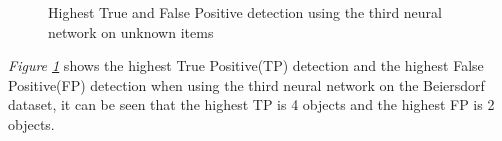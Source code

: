 \begin{figure}[h]
    \centering
    \hfill
    
    \caption{Highest True and False Positive detection using the third neural network on unknown items}
    \label{fig:v3max}
\end{figure}

\textit{Figure \ref{fig:v3max}} shows the highest True Positive(TP) detection and the highest False Positive(FP) detection when using the third neural network on the Beiersdorf dataset, it can be seen that the highest TP is 4 objects and the highest FP is 2 objects.

\clearpage
